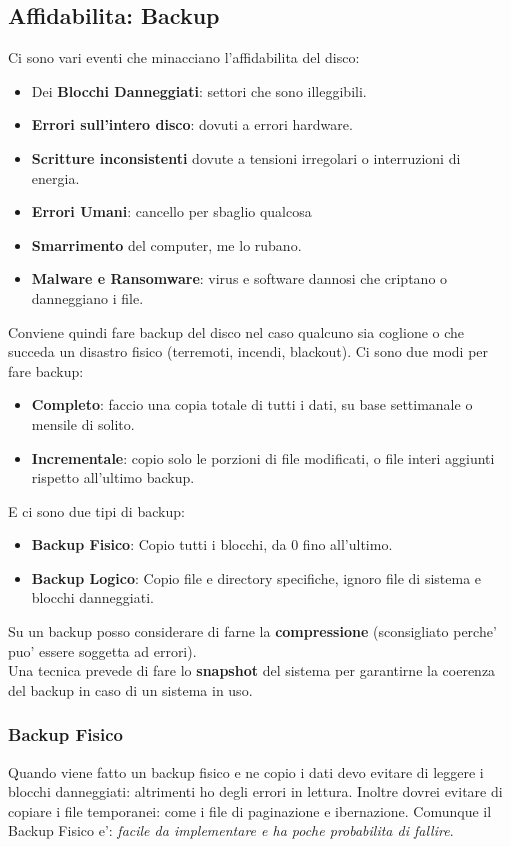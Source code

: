 \subsection{Affidabilita: Backup}
Ci sono vari eventi che minacciano l'affidabilita del disco:
\begin{itemize}
    \item Dei \textbf{Blocchi Danneggiati}: settori che sono illeggibili.
    \item \textbf{Errori sull'intero disco}: dovuti a errori hardware.
    \item \textbf{Scritture inconsistenti} dovute a tensioni irregolari o interruzioni di energia.
    \item \textbf{Errori Umani}: cancello per sbaglio qualcosa 
    \item \textbf{Smarrimento} del computer, me lo rubano.
    \item \textbf{Malware e Ransomware}: virus e software dannosi che criptano o danneggiano i file.
\end{itemize}

Conviene quindi fare backup del disco nel caso qualcuno sia coglione o che succeda un disastro fisico (terremoti, incendi, blackout).
Ci sono due modi per fare backup:
\begin{itemize}
    \item \textbf{Completo}: faccio una copia totale di tutti i dati, su base settimanale o mensile di solito.
    \item \textbf{Incrementale}: copio solo le porzioni di file modificati, o file interi aggiunti rispetto all'ultimo backup.
\end{itemize}

E ci sono due tipi di backup:
\begin{itemize}
    \item \textbf{Backup Fisico}: Copio tutti i blocchi, da 0 fino all'ultimo.
    \item \textbf{Backup Logico}: Copio file e directory specifiche, ignoro file di sistema e blocchi danneggiati.
\end{itemize}

Su un backup posso considerare di farne la \textbf{compressione} (sconsigliato perche' puo' essere soggetta ad errori). \\
Una tecnica prevede di fare lo \textbf{snapshot} del sistema per garantirne la coerenza del backup in caso di un sistema in uso. \\

\subsubsection{Backup Fisico}
Quando viene fatto un backup fisico e ne copio i dati devo evitare di leggere i blocchi danneggiati: altrimenti ho degli errori in lettura.
Inoltre dovrei evitare di copiare i file temporanei: come i file di paginazione e ibernazione.
Comunque il Backup Fisico e': \textit{facile da implementare e ha poche probabilita di fallire}.

